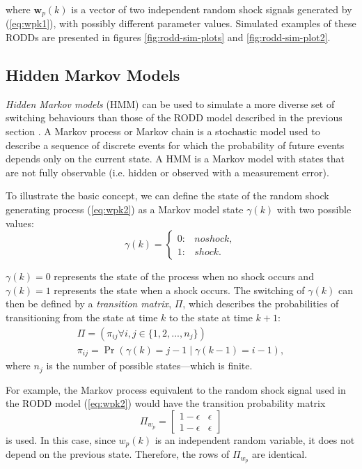 where $\mathbf{w}_p(k)$ is a vector of two independent random shock signals generated by (\ref{eq:wpk1}), with possibly different parameter values. Simulated examples of these RODDs are presented in figures \ref{fig:rodd-sim-plots} and \ref{fig:rodd-sim-plot2}.

\subsection{Hidden Markov Models}

\textit{Hidden Markov models} (HMM) can be used to simulate a more diverse set of switching behaviours than those of the RODD model described in the previous section \citep{wong_realistic_2009}. A Markov process or Markov chain is a stochastic model used to describe a sequence of discrete events for which the probability of future events depends only on the current state. A HMM is a Markov model with states that are not fully observable (i.e. hidden or observed with a measurement error).

To illustrate the basic concept, we can define the state of the random shock generating process (\ref{eq:wpk2}) as a Markov model state $\gamma(k)$ with two possible values:
\begin{equation} \label{eq:gamma-k}
	\gamma(k) = 
	\begin{cases*}
		0: & no shock, \\
		1: & shock.
	\end{cases*}
\end{equation}

$\gamma(k)=0$ represents the state of the process when no shock occurs and $\gamma(k)=1$ represents the state when a shock occurs. The switching of $\gamma(k)$ can then be defined by a \textit{transition matrix}, $\Pi$, which describes the probabilities of transitioning from the state at time $k$ to the state at time $k+1$:
\begin{equation} \label{eq:Pi}
	\begin{split}
	\Pi = \left(\pi_{ij} \forall i,j\in \{1,2,...,n_j\}\right) \\
	\pi_{ij}=\Pr\left( \gamma(k)=j-1 \mid \gamma(k-1)=i-1 \right),
	\end{split}
\end{equation}
where $n_j$ is the number of possible states---which is finite.

For example, the Markov process equivalent to the random shock signal used in the RODD model (\ref{eq:wpk2}) would have the transition probability matrix
\begin{equation} \label{eq:Pi-RODD-step}
	\Pi_{w_{p}} = \begin{bmatrix}
	1-\epsilon & \epsilon \\
	1-\epsilon & \epsilon
	\end{bmatrix}
\end{equation}
is used. In this case, since $w_{p}(k)$ is an independent random variable, it does not depend on the previous state. Therefore, the rows of $\Pi_{w_{p}}$ are identical.

